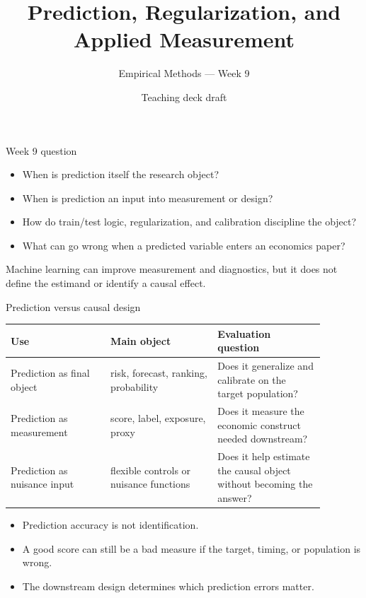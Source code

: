 \documentclass[aspectratio=169,11pt]{beamer}
\title{Prediction, Regularization, and Applied Measurement}
\subtitle{Empirical Methods --- Week 9}
\author{Teaching deck draft}
\date{}
\newcommand{\1}{\mathbf{1}}
\begin{document}
\begin{frame}
  \titlepage
\end{frame}

\begin{frame}{Week 9 question}
\begin{itemize}
    \item When is prediction itself the research object?
    \item When is prediction an input into measurement or design?
    \item How do train/test logic, regularization, and calibration discipline the object?
    \item What can go wrong when a predicted variable enters an economics paper?
\end{itemize}

\medskip
Machine learning can improve measurement and diagnostics, but it does not define the estimand or identify a causal effect.
\end{frame}

\begin{frame}{Prediction versus causal design}
\small
\begin{tabular}{p{0.28\linewidth} p{0.30\linewidth} p{0.30\linewidth}}
\toprule
Use & Main object & Evaluation question \\
\midrule
Prediction as final object & risk, forecast, ranking, probability & Does it generalize and calibrate on the target population? \\
Prediction as measurement & score, label, exposure, proxy & Does it measure the economic construct needed downstream? \\
Prediction as nuisance input & flexible controls or nuisance functions & Does it help estimate the causal object without becoming the answer? \\
\bottomrule
\end{tabular}

\medskip
\begin{itemize}
    \item Prediction accuracy is not identification.
    \item A good score can still be a bad measure if the target, timing, or population is wrong.
    \item The downstream design determines which prediction errors matter.
\end{itemize}
\end{frame}
\end{document}

